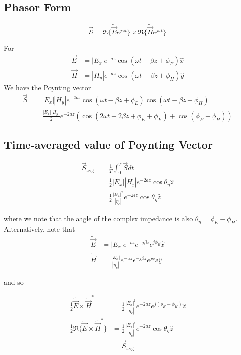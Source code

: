 \documentclass[12pt]{article}
\begin{document}
\subsection{Phasor Form}

$$\vec S = \Re\{\tilde{\vec E}e^{j\omega t}\} \times \Re\{\tilde{\vec H}e^{j\omega t}\}$$

\begin{ex}
    For
    \begin{align*}
        \vec E &= |E_x|e^{-az}\cos(\omega t - \beta z + \phi_E)\hat x \\
        \vec H &= |H_y|e^{-az}\cos(\omega t - \beta z + \phi_H)\hat y
    \end{align*}
    We have the Poynting vector
    \begin{align*}
        \vec S &= |E_x||H_y|e^{-2az}\cos(\omega t - \beta z + \phi_E)\cos(\omega t - \beta z + \phi_H) \\
               &= \frac{|E_x||H_y|}{2}e^{-2az} \left(\cos(2\omega t - 2\beta z + \phi_E + \phi_H) + \cos(\phi_E - \phi_H)\right)
    \end{align*}
\end{ex}

\subsection{Time-averaged value of Poynting Vector}

\begin{align*}
    \vec S_{\text{avg}} &= \frac{1}{T} \int_0^T \vec S dt \\
                        &= \frac{1}{2} |E_x||H_y|e^{-2az}\cos\theta_\eta \hat z \\
                        &= \frac{1}{2} \frac{|E_x|^2}{|\eta_c|}e^{-2az}\cos\theta_\eta \hat z
\end{align*}

where we note that the angle of the complex impedance is also $\theta_\eta = \phi_E - \phi_H$. Alternatively, note that
\begin{align*}
    \tilde{\vec E} &= |E_x|e^{-az}e^{-j\beta z}e^{j\phi_E}\hat x \\
    \tilde{\vec H} &= \frac{|E_x|}{|\eta_c|} e^{-az}e^{-j\beta z}e^{j\phi_H}\hat y
\end{align*}

and so

\begin{align*}
    \frac{1}{2} \tilde{\vec E} \times \tilde{\vec H}^* &= \frac{1}{2} \frac{|E_x|^2}{|\eta_c|} e^{-2az}e^{j(\phi_E - \phi_H)}\hat z \\
    \frac{1}{2}\Re\{\tilde{\vec E} \times \tilde{\vec H}^*\} &= \frac{1}{2} \frac{|E_x|^2}{|\eta_c|} e^{-2az}\cos\theta_\eta \hat z \\
                                                             &= \vec S_{\text{avg}}
\end{align*}
\end{document}
